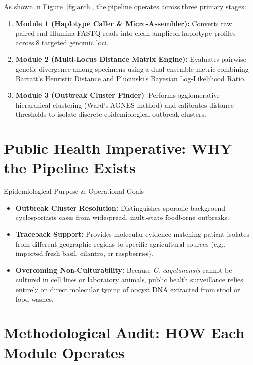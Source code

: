 \documentclass[11pt,a4paper]{article}
\begin{document}
As shown in Figure~\ref{fig:arch}, the pipeline operates across three primary stages:
\begin{enumerate}[leftmargin=*]
    \item \textbf{Module 1 (Haplotype Caller \& Micro-Assembler):} Converts raw paired-end Illumina FASTQ reads into clean amplicon haplotype profiles across 8 targeted genomic loci.
    \item \textbf{Module 2 (Multi-Locus Distance Matrix Engine):} Evaluates pairwise genetic divergence among specimens using a dual-ensemble metric combining Barratt's Heuristic Distance and Plucinski's Bayesian Log-Likelihood Ratio.
    \item \textbf{Module 3 (Outbreak Cluster Finder):} Performs agglomerative hierarchical clustering (Ward's AGNES method) and calibrates distance thresholds to isolate discrete epidemiological outbreak clusters.
\end{enumerate}

\section{Public Health Imperative: WHY the Pipeline Exists}

\begin{conceptbox}{Epidemiological Purpose \& Operational Goals}
\begin{itemize}[leftmargin=*]
    \item \textbf{Outbreak Cluster Resolution:} Distinguishes sporadic background cyclosporiasis cases from widespread, multi-state foodborne outbreaks.
    \item \textbf{Traceback Support:} Provides molecular evidence matching patient isolates from different geographic regions to specific agricultural sources (e.g., imported fresh basil, cilantro, or raspberries).
    \item \textbf{Overcoming Non-Culturability:} Because \textit{C. cayetanensis} cannot be cultured in cell lines or laboratory animals, public health surveillance relies entirely on direct molecular typing of oocyst DNA extracted from stool or food washes.
\end{itemize}
\end{conceptbox}

\section{Methodological Audit: HOW Each Module Operates}
\end{document}
